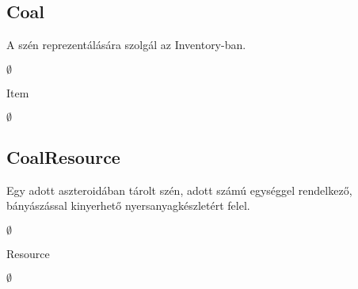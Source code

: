 \subsection{Coal}
\begin{class-template-responsibility}
A szén reprezentálására szolgál az Inventory-ban.
\end{class-template-responsibility}
\begin{class-template-interface}
$\emptyset$
\end{class-template-interface}
\begin{class-template-baseclass}
Item
\end{class-template-baseclass}
\begin{class-template-attribute}
\item[] $\emptyset$
\end{class-template-attribute}
\begin{class-template-method}
\end{class-template-method}


\subsection{CoalResource}
\begin{class-template-responsibility}
Egy adott aszteroidában tárolt szén, adott számú egységgel rendelkező, bányászással kinyerhető nyersanyagkészletért felel. 
\end{class-template-responsibility}
\begin{class-template-interface}
$\emptyset$
\end{class-template-interface}
\begin{class-template-baseclass}
Resource
\end{class-template-baseclass}
\begin{class-template-attribute}
\item[] $\emptyset$
\end{class-template-attribute}
\begin{class-template-method}
\end{class-template-method}


